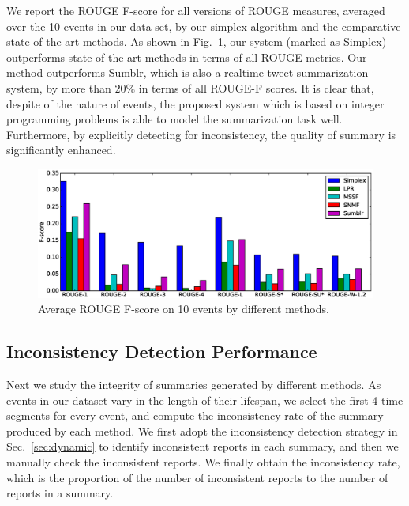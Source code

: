 \documentclass[runningheads]{llncs}
\begin{document}
We report the  ROUGE F-score for all versions of ROUGE measures, averaged over the 10 events in our data set, by our simplex algorithm and the comparative state-of-the-art methods. As shown in Fig.~\ref{fig:rouge}, our system (marked as Simplex) outperforms state-of-the-art methods in terms of all ROUGE metrics. Our method outperforms Sumblr, which is also a realtime tweet summarization system, by more than $20\%$ in terms of all ROUGE-F scores. It is clear that, despite of the nature of events, the proposed system which is based on integer programming problems is able to model the summarization task well. Furthermore, by explicitly detecting for inconsistency, the quality of summary is significantly enhanced.

\vspace{-0.6cm}
\begin{figure}
    \centering
    \includegraphics[width=\textwidth]{rouge10.eps}
\setlength{\abovecaptionskip}{-0.5cm}
\caption{Average ROUGE F-score on 10 events by different methods.}\label{fig:rouge}
\end{figure}
\vspace{-0.6cm}


\subsection{Inconsistency Detection Performance}
Next we study the integrity of summaries generated by different methods. As events in our dataset vary in the length of their lifespan, we select the first 4 time segments for every event, and compute the inconsistency rate of the summary produced by each method. We first adopt the inconsistency detection strategy in Sec.~\ref{sec:dynamic} to identify inconsistent reports in each summary, and then we manually check the inconsistent reports. We finally obtain the inconsistency rate, which is the proportion of the number of inconsistent reports to the number of reports in a summary.
\end{document}

